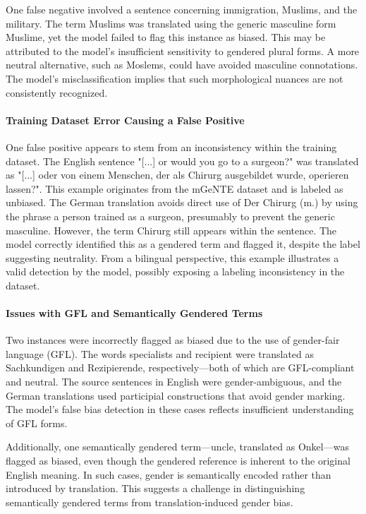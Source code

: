 One false negative involved a sentence concerning immigration, Muslims, and the military. The term Muslims was translated using the generic masculine form Muslime, yet the model failed to flag this instance as biased. This may be attributed to the model’s insufficient sensitivity to gendered plural forms. A more neutral alternative, such as Moslems, could have avoided masculine connotations. The model’s misclassification implies that such morphological nuances are not consistently recognized.

\paragraph{Training Dataset Error Causing a False Positive}

One false positive appears to stem from an inconsistency within the training dataset. The English sentence "[...] or would you go to a surgeon?" was translated as "[...] oder von einem Menschen, der als Chirurg ausgebildet wurde, operieren lassen?". This example originates from the mGeNTE dataset and is labeled as unbiased. The German translation avoids direct use of Der Chirurg (m.) by using the phrase a person trained as a surgeon, presumably to prevent the generic masculine. However, the term Chirurg still appears within the sentence. The model correctly identified this as a gendered term and flagged it, despite the label suggesting neutrality. From a bilingual perspective, this example illustrates a valid detection by the model, possibly exposing a labeling inconsistency in the dataset.

\paragraph{Issues with GFL and Semantically Gendered Terms}

Two instances were incorrectly flagged as biased due to the use of gender-fair language (GFL). The words specialists and recipient were translated as Sachkundigen and Rezipierende, respectively—both of which are GFL-compliant and neutral. The source sentences in English were gender-ambiguous, and the German translations used participial constructions that avoid gender marking. The model’s false bias detection in these cases reflects insufficient understanding of GFL forms.

Additionally, one semantically gendered term—uncle, translated as Onkel—was flagged as biased, even though the gendered reference is inherent to the original English meaning. In such cases, gender is semantically encoded rather than introduced by translation. This suggests a challenge in distinguishing semantically gendered terms from translation-induced gender bias.

